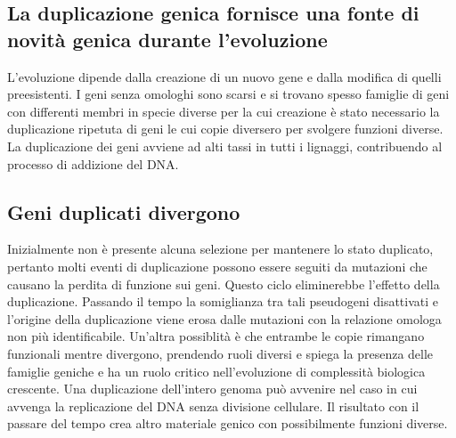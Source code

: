 \subsection{La duplicazione genica fornisce una fonte di novit\`a genica durante l'evoluzione}
L'evoluzione dipende dalla creazione di un nuovo gene e dalla modifica di quelli preesistenti. I geni senza omologhi sono scarsi e si trovano spesso famiglie di geni con differenti 
membri in specie diverse per la cui creazione \`e stato necessario la duplicazione ripetuta di geni le cui copie diversero per svolgere funzioni diverse. La  duplicazione dei geni 
avviene ad alti tassi in tutti i lignaggi, contribuendo al processo di addizione del DNA. 
\subsection{Geni duplicati divergono}
Inizialmente non \`e presente alcuna selezione per mantenere lo stato duplicato, pertanto molti eventi di duplicazione possono essere seguiti da mutazioni che causano la perdita di 
funzione sui geni. Questo ciclo eliminerebbe l'effetto della duplicazione. Passando il tempo la somiglianza tra tali pseudogeni disattivati e l'origine della duplicazione 
viene erosa dalle mutazioni con la relazione omologa non pi\`u identificabile. Un'altra possiblit\`a \`e che entrambe le copie rimangano funzionali mentre divergono, prendendo ruoli 
diversi e spiega la presenza delle famiglie geniche e ha un ruolo critico nell'evoluzione di complessit\`a biologica crescente. Una duplicazione dell'intero genoma pu\`o avvenire
nel caso in cui avvenga la replicazione del DNA senza divisione cellulare. Il risultato con il passare del tempo crea altro materiale genico con possibilmente funzioni diverse. 
